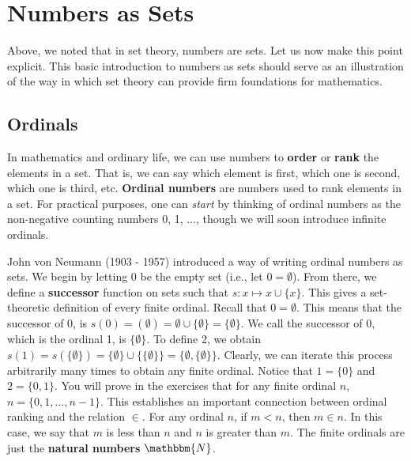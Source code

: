 \documentclass[11pt]{article}
\theoremstyle{definition}
\theoremstyle{remark}
\begin{document}
\section{Numbers as Sets}
Above, we noted that in set theory, numbers are sets. Let us now make this point explicit. This basic introduction to numbers as sets should serve as an illustration of the way in which set theory can provide firm foundations for mathematics.

\subsection{Ordinals}
In mathematics and ordinary life, we can use numbers to \textbf{order} or \textbf{rank} the elements in a set. That is, we can say which element is first, which one is second, which one is third, etc. \textbf{Ordinal numbers} are numbers used to rank elements in a set. For practical purposes, one can \textit{start} by thinking of ordinal numbers as the non-negative counting numbers 0, 1, $\dots$, though we will soon introduce infinite ordinals.\par

John von Neumann (1903 - 1957) introduced a way of writing ordinal numbers as sets. We begin by letting 0 be the empty set (i.e., let $0=\emptyset$). From there, we define a \textbf{successor} function on sets such that $s:x\mapsto x\cup\{x\}$. This gives a set-theoretic definition of every finite ordinal. Recall that $0=\emptyset$. This means that the successor of 0, is $s(0)=(\emptyset)=\emptyset\cup\{\emptyset\}=\{\emptyset\}$. We call the successor of 0, which is the ordinal 1, is $\{\emptyset\}$. To define 2, we obtain $s(1)=s(\{\emptyset\})=\{\emptyset\}\cup\{\{\emptyset\}\}=\{\emptyset,\{\emptyset\}\}$. Clearly, we can iterate this process arbitrarily many times to obtain any finite ordinal. Notice that $1=\{0\}$ and $2=\{0,1\}$. You will prove in the exercises that for any finite ordinal $n$, $n=\{0,1,\dots,n-1\}$. This establishes an important connection between ordinal ranking and the relation $\in$. For any ordinal $n$, if $m<n$, then $m\in n$. In this case, we say that $m$ is less than $n$ and $n$ is greater than $m$. The finite ordinals are just the \textbf{natural numbers} $\mathbbm{N}$.\par
\end{document}
